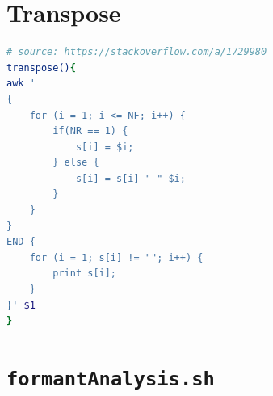 \documentclass{book}
\begin{document}
%
%
%
%
%
%
%



\section{Transpose}
\label{trans}
\begin{lstlisting}[language=bash]
# source: https://stackoverflow.com/a/1729980
transpose(){
awk '
{
    for (i = 1; i <= NF; i++) {
        if(NR == 1) {
            s[i] = $i;
        } else {
            s[i] = s[i] " " $i;
        }
    }
}
END {
    for (i = 1; s[i] != ""; i++) {
        print s[i];
    }
}' $1
}
\end{lstlisting}


\section{\texttt{formantAnalysis.sh}}
\label{fab}
\end{document}
